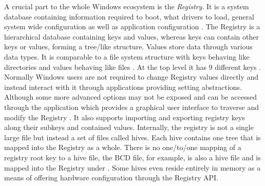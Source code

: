 A crucial part to the whole Windows ecosystem is the \emph{Registry}.
It is a system database containing information required to boot, what drivers to load, general system wide configuration as well as application configuration \cite[Section 1]{windows-internals-7-part1}.
The Registry is a hierarchical database containing keys and values, whereas keys can contain other keys or values, forming a tree\-/like structure.
Values store data through various data types.
It is comparable to a file system structure with keys behaving like directories and values behaving like files \cite[Section 10]{windows-internals-7-part2}.
At the top level it has 9 different keys \cite[Section 10]{windows-internals-7-part2}.
Normally Windows users are not required to change Registry values directly and instead interact with it through applications providing setting abstractions.
Although some more advanced options may not be exposed and can be accessed through the  application which provides a graphical user interface to traverse and modify the Registry \cite[Section 10]{windows-internals-7-part2}.
It also supports importing and exporting registry keys along their subkeys and contained values.
Internally, the registry is not a single large file but instead a set of files called hives.
Each hive contains one tree that is mapped into the Registry as a whole.
There is no one\-/to\-/one mapping of a registry root key to a hive file, the \ac{BCD} file, for example, is also a hive file and is mapped into the Registry under  \cite[Section 10]{windows-internals-7-part2}.
Some hives even reside entirely in memory as a means of offering hardware configuration through the Registry \ac{API}.

